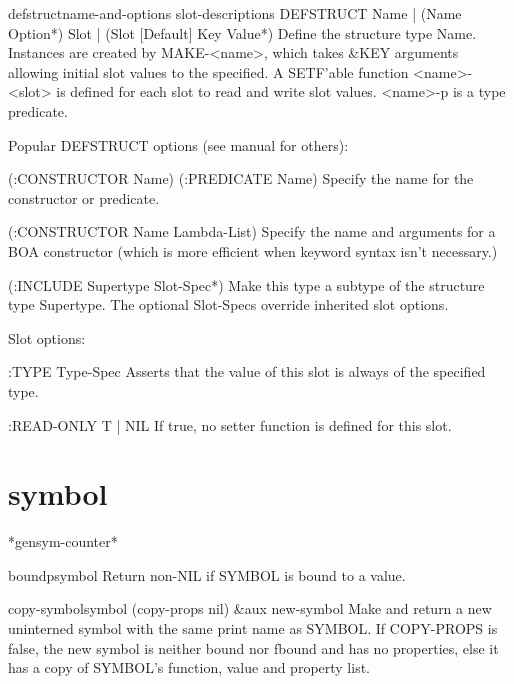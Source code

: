 \begin{macro}{defstruct}{name-and-options \rest slot-descriptions}{}
  DEFSTRUCT {Name | (Name Option*)} {Slot | (Slot [Default] {Key Value}*)}
   Define the structure type Name. Instances are created by MAKE-<name>,
   which takes &KEY arguments allowing initial slot values to the specified.
   A SETF'able function <name>-<slot> is defined for each slot to read and
   write slot values. <name>-p is a type predicate.

   Popular DEFSTRUCT options (see manual for others):

   (:CONSTRUCTOR Name)
   (:PREDICATE Name)
       Specify the name for the constructor or predicate.

   (:CONSTRUCTOR Name Lambda-List)
       Specify the name and arguments for a BOA constructor
       (which is more efficient when keyword syntax isn't necessary.)

   (:INCLUDE Supertype Slot-Spec*)
       Make this type a subtype of the structure type Supertype. The optional
       Slot-Specs override inherited slot options.

   Slot options:

   :TYPE Type-Spec
       Asserts that the value of this slot is always of the specified type.

   :READ-ONLY {T | NIL}
       If true, no setter function is defined for this slot.
\end{macro}

\section{symbol}

\begin{variable}{*gensym-counter*}{}{}
  
\end{variable}

\begin{function}{boundp}{symbol}{}
  Return non-NIL if SYMBOL is bound to a value.
\end{function}

\begin{function}{copy-symbol}{symbol \op (copy-props nil) &aux new-symbol}{}
  Make and return a new uninterned symbol with the same print name
  as SYMBOL. If COPY-PROPS is false, the new symbol is neither bound
  nor fbound and has no properties, else it has a copy of SYMBOL's
  function, value and property list.
\end{function}

